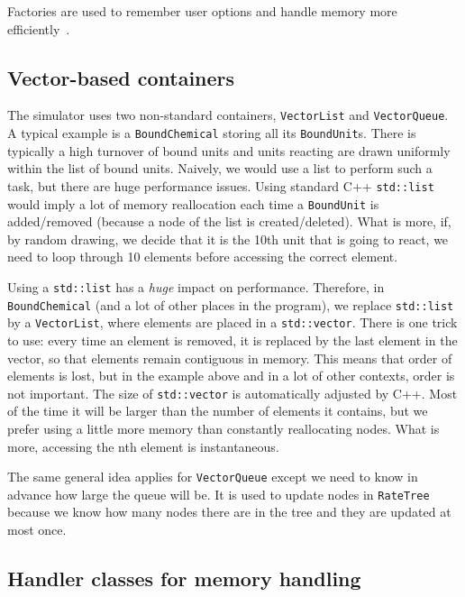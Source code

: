 Factories are used to remember user options and handle memory more efficiently~.

\subsection{Vector-based containers}

The simulator uses two non-standard containers, \texttt{VectorList} and \texttt{VectorQueue}.
A typical example is a \texttt{BoundChemical} storing all its \texttt{BoundUnit}s.
There is typically a high turnover of bound units
and units reacting are drawn uniformly within the list of bound units.
Naively, we would use a list to perform such a task, but there are huge performance issues.
Using standard C++ \texttt{std::list} would imply a lot of memory reallocation each time a \texttt{BoundUnit} is added/removed
(because a node of the list is created/deleted).
What is more, if, by random drawing, we decide that it is the 10th unit that is going to react,
we need to loop through 10 elements before accessing the correct element.

Using a \texttt{std::list} has a \emph{huge} impact on performance.
Therefore, in \texttt{BoundChemical} (and a lot of other places in the program),
we replace \texttt{std::list} by a \texttt{VectorList}, where elements are placed in a \texttt{std::vector}.
There is one trick to use: every time an element is removed,
it is replaced by the last element in the vector, so that elements remain contiguous in memory.
This means that order of elements is lost, but in the example above and in a lot of other contexts,
order is not important.
The size of \texttt{std::vector} is automatically adjusted by C++.
Most of the time it will be larger than the number of elements it contains,
but we prefer using a little more memory than constantly reallocating nodes.
What is more, accessing the nth element is instantaneous.

The same general idea applies for \texttt{VectorQueue} except we need to know in advance how large the queue will be.
It is used to update nodes in \texttt{RateTree} because we know how many nodes there are in the tree and they are updated at most once.

\subsection{Handler classes for memory handling}

